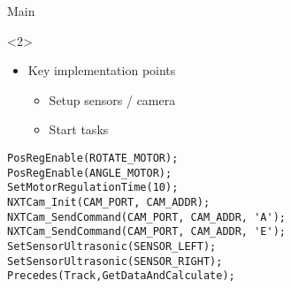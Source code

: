 \begin{frame}[fragile]{Main}
\begin{onlyenv}<2>
\begin{itemize}
  \item Key implementation points
  	\begin{itemize}
  		\item Setup sensors / camera
  		\item Start tasks
	\end{itemize}
\end{itemize}
\begin{center}
\begin{minipage}[H]{0.9\linewidth}
\begin{lstlisting}
PosRegEnable(ROTATE_MOTOR);
PosRegEnable(ANGLE_MOTOR);
SetMotorRegulationTime(10);
NXTCam_Init(CAM_PORT, CAM_ADDR);
NXTCam_SendCommand(CAM_PORT, CAM_ADDR, 'A'); 
NXTCam_SendCommand(CAM_PORT, CAM_ADDR, 'E');
SetSensorUltrasonic(SENSOR_LEFT);
SetSensorUltrasonic(SENSOR_RIGHT);
Precedes(Track,GetDataAndCalculate);
\end{lstlisting} 
\end{minipage}
\end{center}
\end{onlyenv}
\end{frame}

